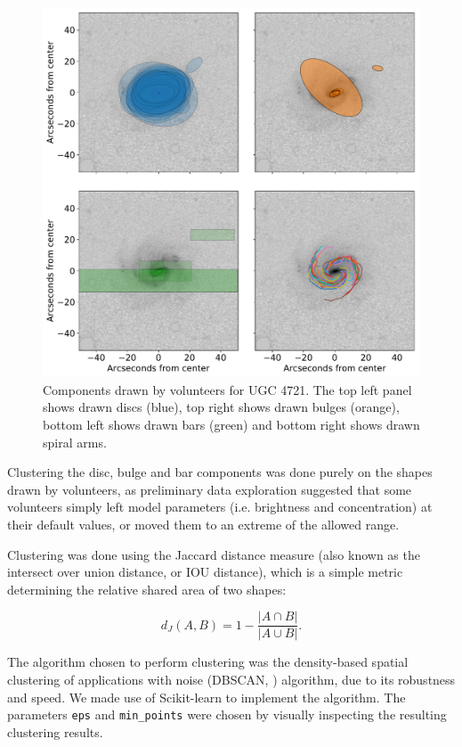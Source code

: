 \documentclass[../main.tex]{subfiles}
\begin{document}
\begin{figure}
  \includegraphics[width=17.3cm]{images__method/drawn_shapes.pdf}
  \caption{Components drawn by volunteers for UGC 4721. The top left panel shows drawn discs (blue), top right shows drawn bulges (orange), bottom left shows drawn bars (green) and bottom right shows drawn spiral arms.}
  \label{fig:drawn_shapes}
\end{figure}

Clustering the disc, bulge and bar components was done purely on the shapes drawn by volunteers, as preliminary data exploration suggested that some volunteers simply left model parameters (i.e. brightness and concentration) at their default values, or moved them to an extreme of the allowed range.

Clustering was done using the Jaccard distance measure (also known as the intersect over union distance, or IOU distance), which is a simple metric determining the relative shared area of two shapes:

\begin{equation}
d_J(A, B) = 1 - \frac{|A \cap B|}{|A \cup B|}.
\end{equation}

The algorithm chosen to perform clustering was the density-based spatial clustering of applications with noise (DBSCAN, \citealt{dbscan}) algorithm, due to its robustness and speed. We made use of Scikit-learn \citep{scikit-learn} to implement the algorithm. The parameters \texttt{eps} and \texttt{min\_points} were chosen by visually inspecting the resulting clustering results.
\end{document}
